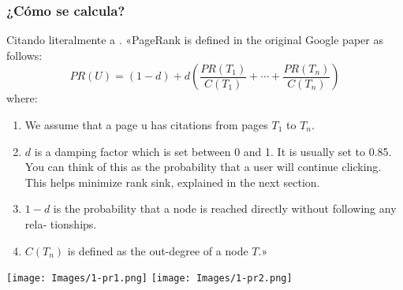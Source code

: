 \subsubsection{¿Cómo se calcula?}
Citando literalmente a \cite{needham2019graph}. «PageRank is defined in the original Google paper as follows: 
$$PR(U)=(1-d)+d\left(\frac{PR(T_1)}{C(T_1)}+\cdots +\frac{PR(T_n)}{C(T_n)}\right)$$
where: 

\begin{enumerate}
    \item  We assume that a page u has citations from pages $T_1$ to $T_n$.
    \item $d$ is a damping factor which is set between 0 and 1. It is usually set to 0.85. You can think of this as the probability that a user will continue clicking. This helps minimize rank sink, explained in the next section.
    \item $1-d$ is the probability that a node is reached directly without following any rela‐ tionships.
    \item $C(T_n)$ is defined as the out-degree of a node $T$.»
\end{enumerate}
\begin{center}
    \texttt{[image: Images/1-pr1.png]}
    \texttt{[image: Images/1-pr2.png]}
\end{center}